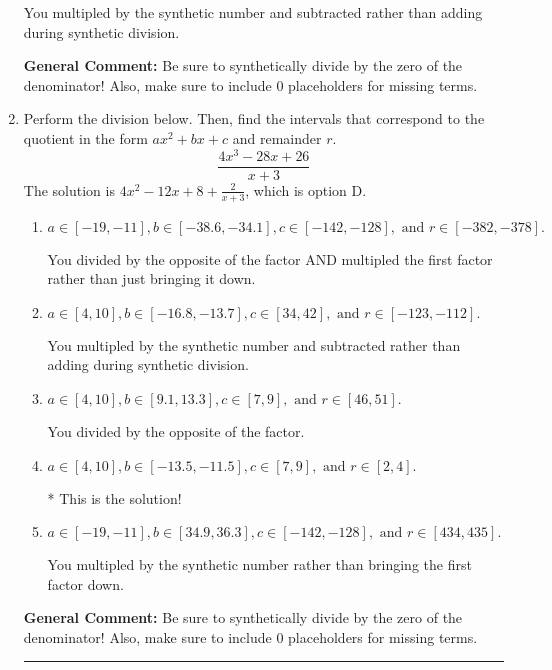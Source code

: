 \documentclass{extbook}[14pt]
\newcommand{\litem}[1]{\item #1

\rule{\textwidth}{0.4pt}}
\begin{document}
\begin{enumerate}
{\begin{enumerate}[label=\Alph*.]
 You multipled by the synthetic number and subtracted rather than adding during synthetic division.
\end{enumerate}

\textbf{General Comment:} Be sure to synthetically divide by the zero of the denominator! Also, make sure to include 0 placeholders for missing terms.
}
\litem{
Perform the division below. Then, find the intervals that correspond to the quotient in the form $ax^2+bx+c$ and remainder $r$.
\[ \frac{4x^{3} -28 x + 26}{x + 3} \]The solution is \( 4x^{2} -12 x + 8 + \frac{2}{x + 3} \), which is option D.\begin{enumerate}[label=\Alph*.]
\item \( a \in [-19, -11], b \in [-38.6, -34.1], c \in [-142, -128], \text{ and } r \in [-382, -378]. \)

 You divided by the opposite of the factor AND multipled the first factor rather than just bringing it down.
\item \( a \in [4, 10], b \in [-16.8, -13.7], c \in [34, 42], \text{ and } r \in [-123, -112]. \)

 You multipled by the synthetic number and subtracted rather than adding during synthetic division.
\item \( a \in [4, 10], b \in [9.1, 13.3], c \in [7, 9], \text{ and } r \in [46, 51]. \)

 You divided by the opposite of the factor.
\item \( a \in [4, 10], b \in [-13.5, -11.5], c \in [7, 9], \text{ and } r \in [2, 4]. \)

* This is the solution!
\item \( a \in [-19, -11], b \in [34.9, 36.3], c \in [-142, -128], \text{ and } r \in [434, 435]. \)

 You multipled by the synthetic number rather than bringing the first factor down.
\end{enumerate}

\textbf{General Comment:} Be sure to synthetically divide by the zero of the denominator! Also, make sure to include 0 placeholders for missing terms.
}
\end{enumerate}
\end{document}
